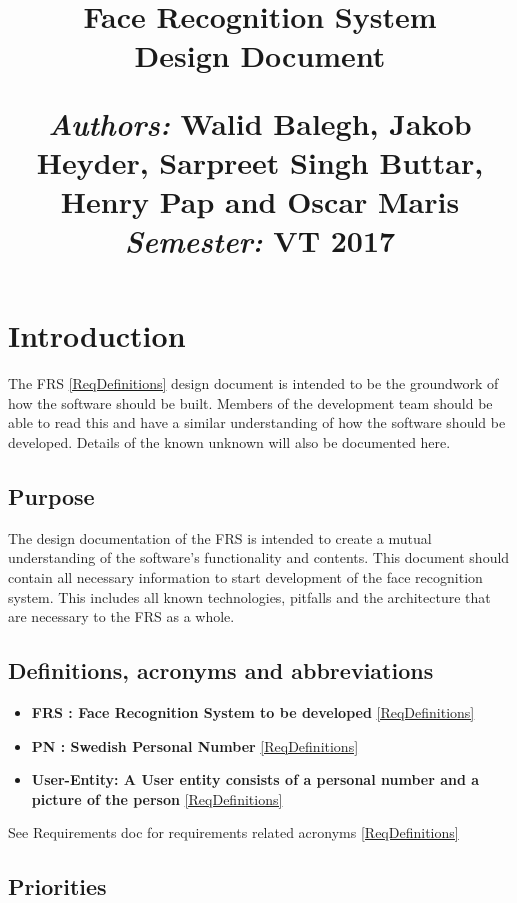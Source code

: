 \documentclass[a4paper,11pt]{article}
\title{
\vspace{-8cm}
\begin{flushleft}
    \vspace{10cm}
    \normalfont \normalsize
    \vspace{-1.3cm}
\end{flushleft}
\vspace{3cm}
\begin{flushleft}
    \huge Face Recognition System \\
    \LARGE  Design Document\\
\end{flushleft}
\null
\vfill
\begin{minipage}{\textwidth}
\begin{flushleft} \large
\emph{Authors:} Walid Balegh, Jakob Heyder, Sarpreet Singh Buttar, Henry \hspace{45pt} Pap and Oscar Maris \\ %
\emph{Semester:} VT 2017\\ %
\end{flushleft}
\end{minipage}
}
\date{}
\begin{document}
\maketitle

\newpage

\tableofcontents

\newpage


\section{Introduction}
The FRS \ref{ReqDefinitions} design document is intended to be the groundwork of how the software should be built. Members of the development team should be able to read this and have a similar understanding of how the software should be developed. Details of the known unknown will also be documented here.

\subsection{Purpose}
The design documentation of the FRS is intended to create a mutual understanding of the software's functionality and contents. This document should contain all necessary information to start development of the face recognition system. This includes all known technologies, pitfalls and the architecture that are necessary to the FRS as a whole. 

\subsection{Definitions, acronyms and abbreviations}
\begin{itemize}
 
\item \textbf{FRS : Face Recognition System to be developed} \ref{ReqDefinitions}
\item \textbf{PN : Swedish Personal Number} \ref{ReqDefinitions}
\item \textbf{User-Entity: A User entity consists of a personal number and a picture of the person} \ref{ReqDefinitions}
\end{itemize}
 
See Requirements doc for requirements related acronyms \ref{ReqDefinitions}


\subsection{Priorities}
\end{document}
